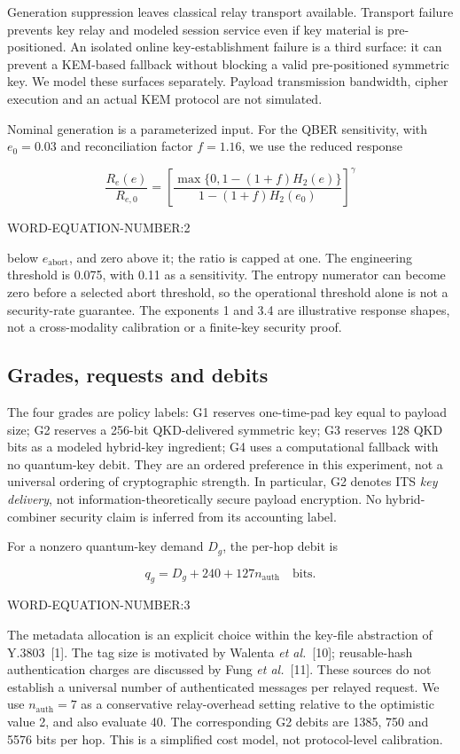 \documentclass[conference,a4paper]{IEEEtran}
\begin{document}
Generation suppression leaves classical relay transport available. Transport failure prevents key relay and modeled session service even if key material is pre-positioned. An isolated online key-establishment failure is a third surface: it can prevent a KEM-based fallback without blocking a valid pre-positioned symmetric key. We model these surfaces separately. Payload transmission bandwidth, cipher execution and an actual KEM protocol are not simulated.

Nominal generation is a parameterized input. For the QBER sensitivity, with $e_0=0.03$ and reconciliation factor $f=1.16$, we use the reduced response


\[
\frac{R_e(e)}{R_{e,0}}=\left[\frac{\max\{0,1-(1+f)H_2(e)\}}{1-(1+f)H_2(e_0)}\right]^{\gamma}
\]

WORD-EQUATION-NUMBER:2


below $e_{\mathrm{abort}}$, and zero above it; the ratio is capped at one. The engineering threshold is 0.075, with 0.11 as a sensitivity. The entropy numerator can become zero before a selected abort threshold, so the operational threshold alone is not a security-rate guarantee. The exponents 1 and 3.4 are illustrative response shapes, not a cross-modality calibration or a finite-key security proof.

\subsection{Grades, requests and debits}
The four grades are policy labels: G1 reserves one-time-pad key equal to payload size; G2 reserves a 256-bit QKD-delivered symmetric key; G3 reserves 128 QKD bits as a modeled hybrid-key ingredient; G4 uses a computational fallback with no quantum-key debit. They are an ordered preference in this experiment, not a universal ordering of cryptographic strength. In particular, G2 denotes ITS \emph{key delivery}, not information-theoretically secure payload encryption. No hybrid-combiner security claim is inferred from its accounting label.

For a nonzero quantum-key demand $D_g$, the per-hop debit is


\[
q_g=D_g+240+127n_{\mathrm{auth}}\quad\text{bits}.
\]

WORD-EQUATION-NUMBER:3


The metadata allocation is an explicit choice within the key-file abstraction of Y.3803~[1]. The tag size is motivated by Walenta \emph{et al.}~[10]; reusable-hash authentication charges are discussed by Fung \emph{et al.}~[11]. These sources do not establish a universal number of authenticated messages per relayed request. We use $n_{\mathrm{auth}}=7$ as a conservative relay-overhead setting relative to the optimistic value 2, and also evaluate 40. The corresponding G2 debits are 1385, 750 and 5576 bits per hop. This is a simplified cost model, not protocol-level calibration.
\end{document}
